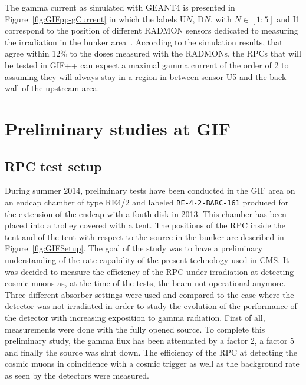 	The gamma current as simulated with GEANT4 is presented in Figure~\ref{fig:GIFpp-gCurrent} in which the labels U$N$, D$N$, with $N \in [1:5]$ and I1 correspond to the position of different \acf{RADMON} sensors dedicated to measuring the irradiation in the bunker area~\cite{PFEIFFER2017}. According to the simulation results, that agree within 12\% to the doses measured with the RADMONs, the RPCs that will be tested in GIF++ can expect a maximal gamma current of the order of 2 to  \siflux assuming they will always stay in a region in between sensor U5 and the back wall of the upstream area.
	 
\section{Preliminary studies at GIF}
\label{chapt5:sec:GIFtests}

	\subsection{RPC test setup}
	\label{chapt5:ssec:RPCSetup}
	
	During summer 2014, preliminary tests have been conducted in the GIF area on an endcap chamber of type RE4/2 and labeled \texttt{RE-4-2-BARC-161} produced for the extension of the endcap with a fouth disk in 2013. This chamber has been placed into a trolley covered with a tent. The positions of the RPC inside the tent and of the tent with respect to the source in the bunker are described in Figure~\ref{fig:GIFSetup}. The goal of the study was to have a preliminary understanding of the rate capability of the present technology used in CMS. It was decided to measure the efficiency of the RPC under irradiation at detecting cosmic muons as, at the time of the tests, the beam not operational anymore. Three different absorber settings were used and compared to the case where the detector was not irradiated in order to study the evolution of the performance of the detector with increasing exposition to gamma radiation. First of all, measurements were done with the fully opened source. To complete this preliminary study, the gamma flux has been attenuated by a factor 2, a factor 5 and finally the source was shut down. The efficiency of the RPC at detecting the cosmic muons in coincidence with a cosmic trigger as well as the background rate as seen by the detectors were measured.

